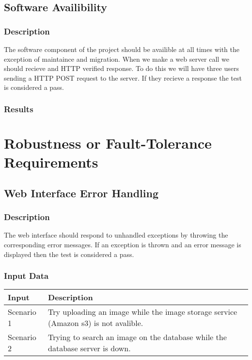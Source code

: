 \documentclass{scrreprt}
\begin{document}
\subsection{Software Availibility}
\subsubsection{Description}
\begin{flushleft}
The software component of the project should be availible at all times with the exception of maintaince and migration. When we make a web server call we should recieve and HTTP verified response. To do this we will have three users sending a HTTP POST request to the server. If they recieve a response the test is considered a pass.
\end{flushleft}
\subsubsection{Results}
\begin{flushleft}

\end{flushleft}

\section{Robustness or Fault-Tolerance Requirements}
\subsection{Web Interface Error Handling}
\subsubsection{Description}
\begin{flushleft}
The web interface should respond to unhandled exceptions by throwing the corresponding error messages. If an exception is thrown and an error message is displayed then the test is considered a pass.
\end{flushleft}
\subsubsection{Input Data}
 \centering
 \begin{tabular}{p{3cm}p{6cm}}
 \hline\hline
 Input & Description\\
 \hline\hline
  Scenario 1 &  Try uploading an image while the image storage service (Amazon s3) is not avalible. \\
 \hline
  Scenario 2 & Trying to search an image on the database while the database server is down.
 \end{tabular}
\end{document}
